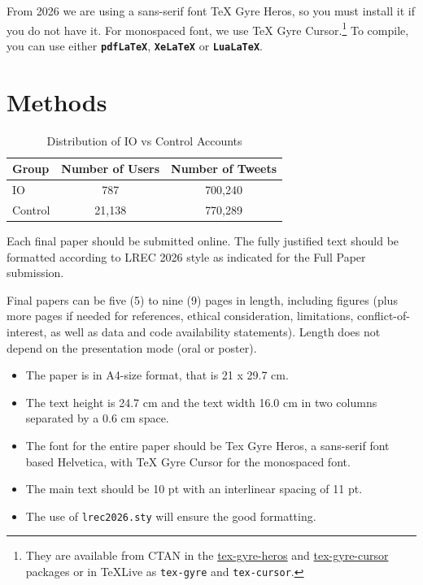 \documentclass[10pt, a4paper]{article}
\begin{document}
From 2026 we are using a sans-serif font TeX Gyre Heros, so you must
install it if you do not have it.  For monospaced font, we use TeX
Gyre Cursor.\footnote{They are available from CTAN in the
  \href{https://ctan.org/pkg/tex-gyre-heros}{tex-gyre-heros} and
  \href{https://ctan.org/pkg/tex-gyre-cursor}{tex-gyre-cursor} packages
    or in TeXLive as \texttt{tex-gyre} and \texttt{tex-cursor}.}  To
  compile, you can use either \textbf{\texttt{pdfLaTeX}},
  \textbf{\texttt{XeLaTeX}} or \textbf{\texttt{LuaLaTeX}}.

\section{Methods}
\begin{table}[h]
\centering
\caption{Distribution of IO vs Control Accounts}
\begin{tabular}{lcc}
\hline
Group & Number of Users & Number of Tweets \\
\hline
IO  & 787 & 700,240 \\
Control & 21,138 & 770,289 \\
\hline
\end{tabular}
\label{tab:io_distribution}
\end{table}


Each final paper should be submitted online. The fully justified text should be formatted according to LREC 2026 style as indicated for the Full Paper submission.

Final papers can be five (5) to nine (9)  pages in length, including figures (plus more pages if needed for references, ethical consideration, limitations, conflict-of-interest, as well as data and code availability statements).  
Length does not depend on the presentation mode (oral or poster).

\begin{itemize}
\item The paper is in A4-size format, that is 21 x 29.7 cm.
\item The text height is 24.7 cm and the text width 16.0 cm in two
  columns separated by a 0.6 cm space.
\item The font for the entire paper should be Tex Gyre Heros, a
  sans-serif font based Helvetica, with TeX Gyre Cursor for the
  monospaced font.
\item The main text should be 10 pt with an interlinear spacing of 11
  pt.
\item The use of \texttt{lrec2026.sty} will ensure the good formatting.
\end{itemize}
\end{document}
